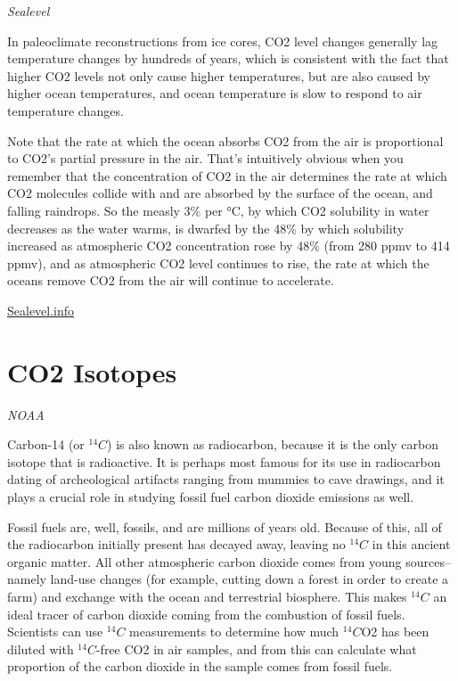 \documentclass[
]{book}
\begin{document}
\emph{Sealevel}

In paleoclimate reconstructions from ice cores, CO2 level changes generally lag temperature changes by hundreds of years, which is consistent with the fact that higher CO2 levels not only cause higher temperatures, but are also caused by higher ocean temperatures, and ocean temperature is slow to respond to air temperature changes.

Note that the rate at which the ocean absorbs CO2 from the air is proportional to CO2's partial pressure in the air. That's intuitively obvious when you remember that the concentration of CO2 in the air determines the rate at which CO2 molecules collide with and are absorbed by the surface of the ocean, and falling raindrops. So the measly 3\% per °C, by which CO2 solubility in water decreases as the water warms, is dwarfed by the 48\% by which solubility increased as atmospheric CO2 concentration rose by 48\% (from 280 ppmv to 414 ppmv), and as atmospheric CO2 level continues to rise, the rate at which the oceans remove CO2 from the air will continue to accelerate.

\href{https://sealevel.info/atmospheric_co2_increase_is_not_from_ocean_outgassing.html}{Sealevel.info}

\hypertarget{co2-isotopes}{%
\chapter{CO2 Isotopes}\label{co2-isotopes}}

\emph{NOAA}

Carbon-14 (or \({}^{14}C\)) is also known as radiocarbon, because it is the only carbon isotope that is radioactive. It is perhaps most famous for its use in radiocarbon dating of archeological artifacts ranging from mummies to cave drawings, and it plays a crucial role in studying fossil fuel carbon dioxide emissions as well.

Fossil fuels are, well, fossils, and are millions of years old. Because of this, all of the radiocarbon initially present has decayed away, leaving no \({}^{14}C\) in this ancient organic matter. All other atmospheric carbon dioxide comes from young sources--namely land-use changes (for example, cutting down a forest in order to create a farm) and exchange with the ocean and terrestrial biosphere. This makes \({}^{14}C\) an ideal tracer of carbon dioxide coming from the combustion of fossil fuels. Scientists can use \({}^{14}C\) measurements to determine how much \({}^{14}C\)O2 has been diluted with \({}^{14}C\)-free CO2 in air samples, and from this can calculate what proportion of the carbon dioxide in the sample comes from fossil fuels.
\end{document}
